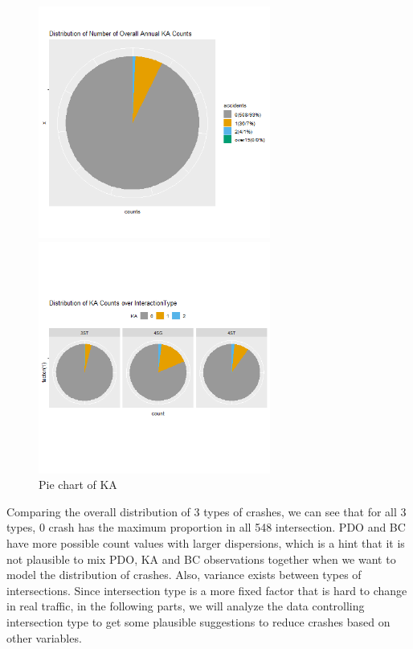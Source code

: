 \documentclass[11pt]{scrartcl} %
\begin{document}
\begin{figure}[H]
\begin{minipage}[t]{0.5\linewidth}
\centering
\includegraphics[width=3in]{image/p112.png}
\small
\end{minipage}
\begin{minipage}[t]{0.5\linewidth}
\centering
\includegraphics[width=3in]{image/p121_KA.png}
\small
\end{minipage}
\caption{Pie chart of KA}
\end{figure}

Comparing the overall distribution of 3 types of crashes, we can see that for all 3 types, 0 crash has the maximum proportion in all 548 intersection. PDO and BC have more possible count values with larger dispersions, which is a hint that it is not plausible to mix PDO, KA and BC observations together when we want to model the distribution of crashes. Also, variance exists between types of intersections. Since intersection type is a more fixed factor that is hard to change in real traffic, in the following parts, we will analyze the data controlling intersection type to get some plausible suggestions to reduce crashes based on other variables.
\end{document}
